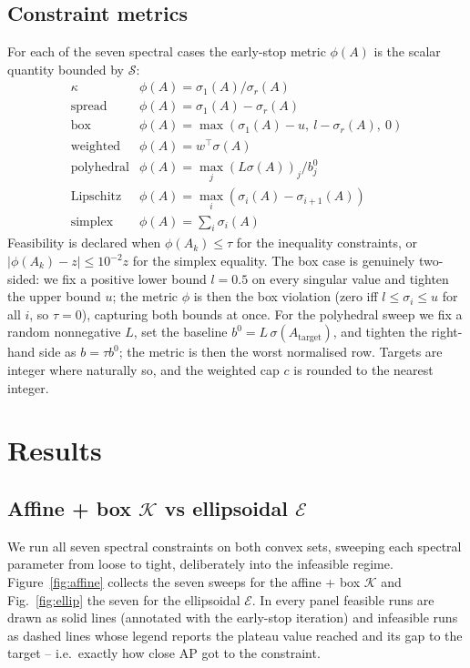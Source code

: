 \documentclass[journal]{IEEEtran}
\newcommand{\sgm}{\sigma}
\newcommand{\spec}{\mathcal{S}}
\newcommand{\Kset}{\mathcal{K}}
\newcommand{\Ellipsoid}{\mathcal{E}}
\begin{document}
\subsection{Constraint metrics}
For each of the seven spectral cases the early-stop metric $\phi(A)$ is
the scalar quantity bounded by $\spec$:
\[
\begin{array}{ll}
\kappa & \phi(A) = \sgm_1(A)/\sgm_r(A) \\
\text{spread} & \phi(A) = \sgm_1(A) - \sgm_r(A) \\
\text{box} & \phi(A) = \max(\sgm_1(A)-u,\ l-\sgm_r(A),\ 0) \\
\text{weighted} & \phi(A) = w^\top \sgm(A) \\
\text{polyhedral} & \phi(A) = \max_j (L\sgm(A))_j / b^0_j \\
\text{Lipschitz} & \phi(A) = \max_i (\sgm_i(A) - \sgm_{i+1}(A)) \\
\text{simplex} & \phi(A) = \textstyle\sum_i \sgm_i(A)
\end{array}
\]
Feasibility is declared when $\phi(A_k) \le \tau$ for the inequality
constraints, or $|\phi(A_k) - z| \le 10^{-2}z$ for the simplex equality.
The box case is genuinely two-sided: we fix a positive lower bound
$l=0.5$ on every singular value and tighten the upper bound $u$; the
metric $\phi$ is then the box violation (zero iff $l \le \sgm_i \le u$
for all $i$, so $\tau=0$), capturing both bounds at once.
For the polyhedral sweep we fix a random nonnegative $L$, set the
baseline $b^0 = L\,\sgm(A_\mathrm{target})$, and tighten the right-hand
side as $b = \tau b^0$; the metric is then the worst normalised row.
Targets are integer where naturally so, and the weighted cap $c$ is
rounded to the nearest integer.

\section{Results}\label{sec:results}

\subsection{Affine + box $\Kset$ vs ellipsoidal $\Ellipsoid$}

We run all seven spectral constraints on both convex sets, sweeping each
spectral parameter from loose to tight, deliberately into the infeasible
regime. Figure~\ref{fig:affine} collects the seven sweeps for the affine
+ box $\Kset$ and Fig.~\ref{fig:ellip} the seven for the ellipsoidal
$\Ellipsoid$. In every panel feasible runs are drawn as solid lines
(annotated with the early-stop iteration) and infeasible runs as dashed
lines whose legend reports the plateau value reached and its gap to the
target -- i.e.\ exactly how close AP got to the constraint.
\end{document}
